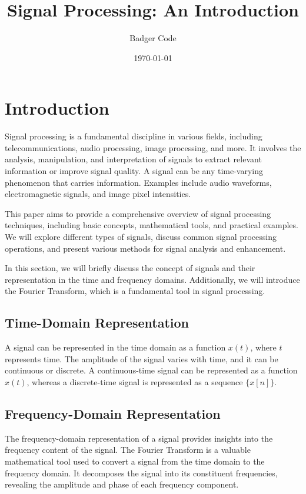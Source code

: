 \documentclass{article}
\title{Signal Processing: An Introduction}
\author{Badger Code}
\date{\today}
\begin{document}
\maketitle

\section{Introduction}
Signal processing is a fundamental discipline in various fields, including telecommunications, audio processing, image processing, and more. It involves the analysis, manipulation, and interpretation of signals to extract relevant information or improve signal quality. A signal can be any time-varying phenomenon that carries information. Examples include audio waveforms, electromagnetic signals, and image pixel intensities.

This paper aims to provide a comprehensive overview of signal processing techniques, including basic concepts, mathematical tools, and practical examples. We will explore different types of signals, discuss common signal processing operations, and present various methods for signal analysis and enhancement.

In this section, we will briefly discuss the concept of signals and their representation in the time and frequency domains. Additionally, we will introduce the Fourier Transform, which is a fundamental tool in signal processing.

\subsection{Time-Domain Representation}
A signal can be represented in the time domain as a function $x(t)$, where $t$ represents time. The amplitude of the signal varies with time, and it can be continuous or discrete. A continuous-time signal can be represented as a function $x(t)$, whereas a discrete-time signal is represented as a sequence $\{x[n]\}$.

\subsection{Frequency-Domain Representation}
The frequency-domain representation of a signal provides insights into the frequency content of the signal. The Fourier Transform is a valuable mathematical tool used to convert a signal from the time domain to the frequency domain. It decomposes the signal into its constituent frequencies, revealing the amplitude and phase of each frequency component.
\end{document}
